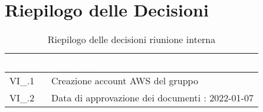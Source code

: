 \section{Riepilogo delle Decisioni}


\begin{table}[!htbp]
\renewcommand{\arraystretch}{1.5}
\begin{tabular}{m{}<{\centering}  m{}<{\centering}}
\rowcolor{darkblue} \textcolor{white}{\textbf{Codice}} & \textcolor{white}{\textbf{Decisione}} \\
\hline
VI\_\D{}.1 & Creazione account AWS del gruppo\\
\rowcolor{gray!10} VI\_\D{}.2 & Data di approvazione dei documenti : 2022-01-07\\
\end{tabular}
\caption{Riepilogo delle decisioni riunione interna \D{}}
\end{table}